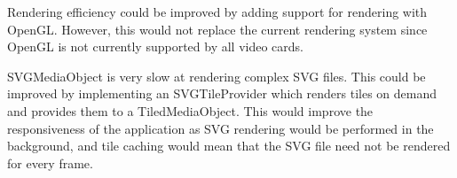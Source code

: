 \documentclass{report}
\begin{document}
  Rendering efficiency could be improved by adding support for rendering with
  OpenGL. However, this would not replace the current rendering system since
  OpenGL is not currently supported by all video cards.

  SVGMediaObject is very slow at rendering complex SVG files. This could be
  improved by implementing an SVGTileProvider which renders tiles on demand and
  provides them to a TiledMediaObject. This would improve the responsiveness of
  the application as SVG rendering would be performed in the background, and
  tile caching would mean that the SVG file need not be rendered for every
  frame.
\end{document}
